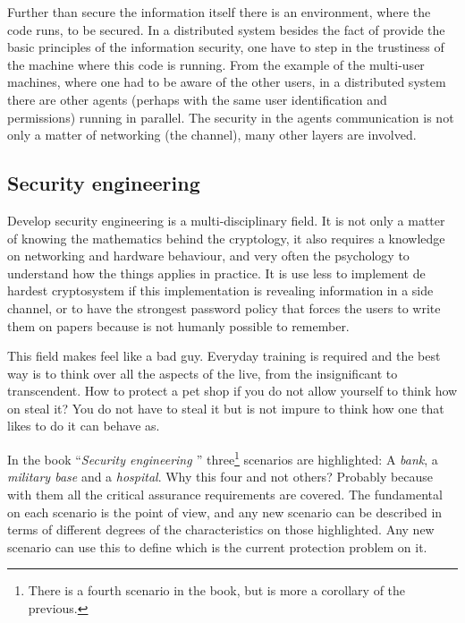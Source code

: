 \documentclass[10pt,a4paper,twoside]{llncs}
\newcommand{\todo}[1]{\texttt{\color{red}TODO:} ``\emph{#1}''}
\begin{document}
Further than secure the information itself there is an environment, where the code runs, to be secured. In a distributed system besides the fact of provide the basic principles of the information security, one have to step in the trustiness of the machine where this code is running. From the example of the multi-user machines, where one had to be aware of the other users, in a distributed system there are other agents (perhaps with the same user identification and permissions) running in parallel. The security in the agents communication is not only a matter of networking (the channel), many other layers are involved.


\subsection{Security engineering}\label{sec:SecurityEngineering}

Develop security engineering is a multi-disciplinary field. It is not only a matter of knowing the mathematics behind the cryptology, it also requires a knowledge on networking and hardware behaviour, and very often the psychology to understand how the things applies in practice. It is use less to implement de hardest cryptosystem if this implementation is revealing information in a side channel, or to have the strongest password policy that forces the users to write them on papers because is not humanly possible to remember.

This field makes feel like a bad guy. Everyday training is required and the best way is to think over all the aspects of the live, from the insignificant to transcendent. How to protect a pet shop if you do not allow yourself to think how on steal it? You do not have to steal it but is not impure to think how one that likes to do it can behave as.

In the book ``\emph{Security engineering \cite{SecEngRossAnderson}}'' three\footnote{There is a fourth scenario in the book, but is more a corollary of the previous.} scenarios are highlighted: A \emph{bank}, a \emph{military base} and a \emph{hospital}. Why this four and not others? Probably because with them all the critical assurance requirements are covered. The fundamental on each scenario is the point of view, and any new scenario can be described in terms of different degrees of the characteristics on those highlighted. Any new scenario can use this to define which is the current protection problem on it.
\end{document}
